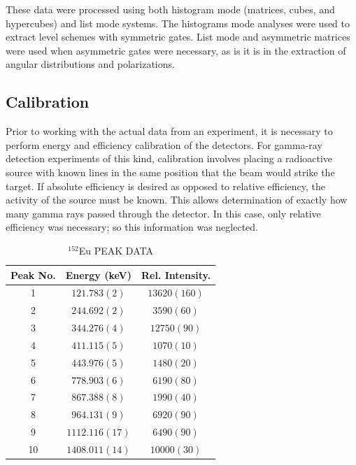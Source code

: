 These data were processed using both histogram mode (matrices, cubes, and hypercubes)\cite{radware} and list mode\cite{ROOT,blue} systems. The histograms mode analyses were used to extract level schemes with symmetric gates. List mode and asymmetric matrices were used when asymmetric gates were necessary, as is it is in the extraction of angular distributions and polarizations.
 
\subsection{Calibration}
\label{ssec:exp-pr-data-proc-cal}
Prior to working with the actual data from an experiment, it is necessary to perform energy and efficiency calibration of the detectors. For gamma-ray detection experiments of this kind, calibration involves placing a radioactive source with known lines in the same position that the beam would strike the target. If absolute efficiency is desired as opposed to relative efficiency, the activity of the source must be known. This allows determination of exactly how many gamma rays passed through the detector. In this case, only relative efficiency was necessary; so this information was neglected.

\begin{table}[hT!]
\caption{$^{152}$Eu PEAK DATA \label{tbl:152Eu-peaks}}
\begin{center}
\begin{tabular}{ccc}
\toprule
Peak No. & Energy (keV) & Rel. Intensity. \\ 
\midrule
1 & $121.783(2)$ & $13620(160)$ \\ 
2 & $244.692(2)$ & $3590(60)$ \\ 
3 & $344.276(4)$ & $12750(90)$ \\ 
4 & $411.115(5)$ & $1070(10)$ \\ 
5 & $443.976(5)$ & $1480(20)$ \\ 
6 & $778.903(6)$ & $6190(80)$ \\ 
7 & $867.388(8)$ & $1990(40)$ \\ 
8 & $964.131(9)$ & $6920(90)$ \\ 
9 & $1112.116(17)$ & $6490(90)$ \\ 
10 & $1408.011(14)$ & $10000(30)$ \\ 
\bottomrule
\end{tabular} 
\end{center}
\end{table}

